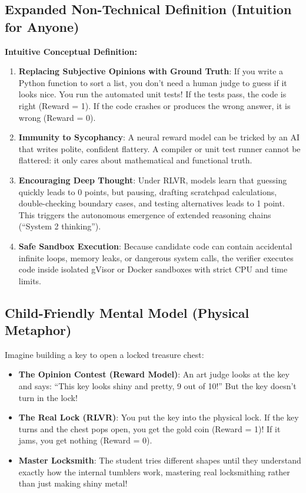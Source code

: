 \documentclass[11pt,a4paper]{article}
\theoremstyle{definition}
\begin{document}
\subsection{Expanded Non-Technical Definition (Intuition for Anyone)}
\textbf{Intuitive Conceptual Definition:}
\begin{enumerate}
    \item \textbf{Replacing Subjective Opinions with Ground Truth}: If you write a Python function to sort a list, you don't need a human judge to guess if it looks nice. You run the automated unit tests! If the tests pass, the code is right (Reward = 1). If the code crashes or produces the wrong answer, it is wrong (Reward = 0).
    \item \textbf{Immunity to Sycophancy}: A neural reward model can be tricked by an AI that writes polite, confident flattery. A compiler or unit test runner cannot be flattered: it only cares about mathematical and functional truth.
    \item \textbf{Encouraging Deep Thought}: Under RLVR, models learn that guessing quickly leads to 0 points, but pausing, drafting scratchpad calculations, double-checking boundary cases, and testing alternatives leads to 1 point. This triggers the autonomous emergence of extended reasoning chains (``System 2 thinking'').
    \item \textbf{Safe Sandbox Execution}: Because candidate code can contain accidental infinite loops, memory leaks, or dangerous system calls, the verifier executes code inside isolated gVisor or Docker sandboxes with strict CPU and time limits.
\end{enumerate}

\subsection{Child-Friendly Mental Model (Physical Metaphor)}
Imagine building a key to open a locked treasure chest:
\begin{itemize}
    \item \textbf{The Opinion Contest (Reward Model)}: An art judge looks at the key and says: ``This key looks shiny and pretty, 9 out of 10!'' But the key doesn't turn in the lock!
    \item \textbf{The Real Lock (RLVR)}: You put the key into the physical lock. If the key turns and the chest pops open, you get the gold coin (Reward = 1)! If it jams, you get nothing (Reward = 0).
    \item \textbf{Master Locksmith}: The student tries different shapes until they understand exactly how the internal tumblers work, mastering real locksmithing rather than just making shiny metal!
\end{itemize}
\end{document}
